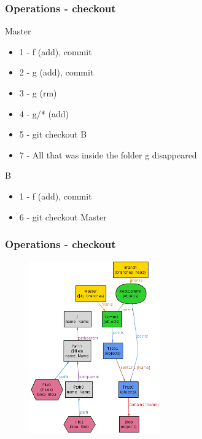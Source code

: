 \documentclass{beamer}
\begin{document}
\begin{frame}
	\frametitle{Operations - checkout}
	\begin{block}{Master}
	\begin{itemize}
		\item 1 - f (add), commit
		\item 2 - g (add), commit
		\item 3 - g (rm)
		\item 4 - g/* (add)
		\item 5 - git checkout B
		\item 7 - All that was inside the folder g disappeared
	\end{itemize}
	\end{block}

	\begin{block}{B}
	\begin{itemize}
		\item 1 - f (add), commit
		\item 6 - git checkout Master
	\end{itemize}
	\end{block}
\end{frame}

\begin{frame}[fragile]
   \frametitle{Operations - checkout}
      \begin{figure}
         \centering
         \includegraphics[width=0.50\textwidth]{images/checkout1.png}
      \end{figure}
\end{frame}
\end{document}
